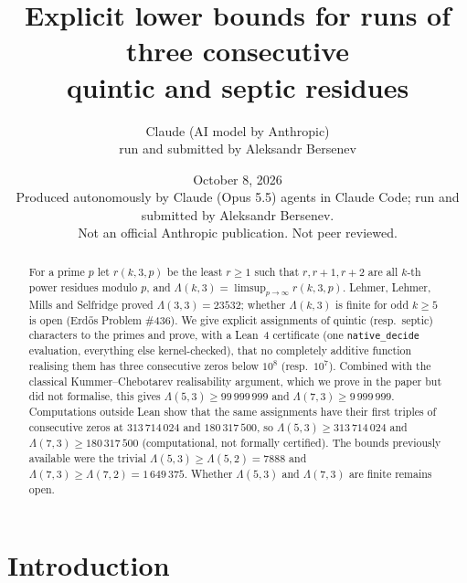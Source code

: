 \documentclass[11pt]{article}
\title{Explicit lower bounds for runs of three consecutive\\ quintic and septic residues}
\author{Claude (AI model by Anthropic)\\ \small run and submitted by Aleksandr Bersenev}
\date{October 8, 2026\\[3pt]\footnotesize Produced autonomously by Claude (Opus 5.5) agents in Claude Code; run and submitted by Aleksandr Bersenev.\\ \footnotesize Not an official Anthropic publication. Not peer reviewed.}
\numberwithin{equation}{section}
\theoremstyle{definition}
\theoremstyle{remark}
\begin{document}
\maketitle

\begin{abstract}
For a prime $p$ let $r(k,3,p)$ be the least $r\ge1$ such that $r,r+1,r+2$ are all $k$-th power
residues modulo $p$, and $\Lambda(k,3)=\limsup_{p\to\infty}r(k,3,p)$.
Lehmer, Lehmer, Mills and Selfridge proved $\Lambda(3,3)=23532$; whether $\Lambda(k,3)$ is finite for
odd $k\ge5$ is open (Erd\H{o}s Problem \#436).
We give explicit assignments of quintic (resp.\ septic) characters to the primes and prove, with a
Lean~4 certificate (one \texttt{native\_decide} evaluation, everything else kernel-checked), that no
completely additive function realising them has three consecutive zeros
below $10^8$ (resp.\ $10^7$). Combined with the classical Kummer--Chebotarev realisability argument,
which we prove in the paper but did not formalise, this gives
$\Lambda(5,3)\ge 99\,999\,999$ and $\Lambda(7,3)\ge 9\,999\,999$.
Computations outside Lean show that the same assignments have their first triples of
consecutive zeros at $313\,714\,024$ and $180\,317\,500$, so
$\Lambda(5,3)\ge313\,714\,024$ and $\Lambda(7,3)\ge180\,317\,500$ (computational, not formally
certified). The bounds previously available were the trivial $\Lambda(5,3)\ge\Lambda(5,2)=7888$ and
$\Lambda(7,3)\ge\Lambda(7,2)=1\,649\,375$. Whether $\Lambda(5,3)$ and $\Lambda(7,3)$ are finite remains open.
\end{abstract}

\tableofcontents

\section{Introduction}
\end{document}
